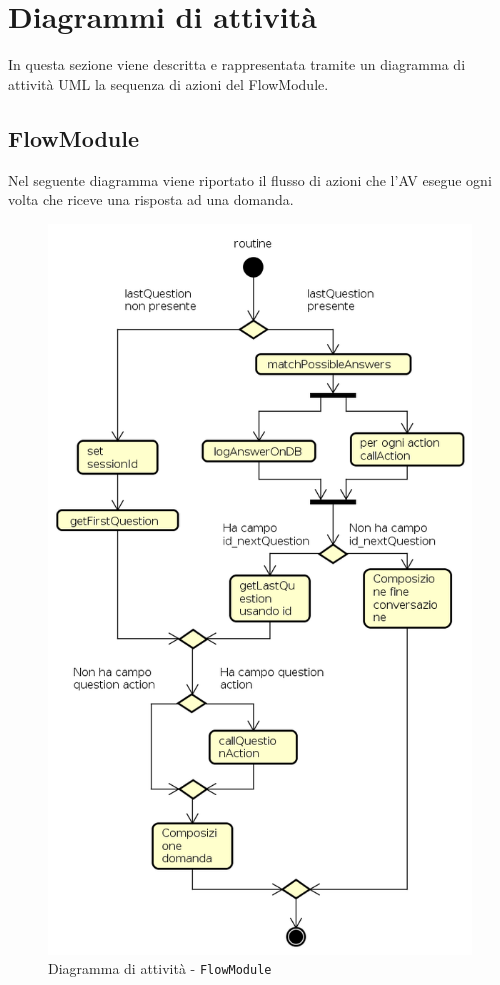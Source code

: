 \documentclass[../DefinizioneDiProdotto_v3.0.0.tex]{subfiles}
\begin{document}
\section{Diagrammi di attività}
In questa sezione viene descritta e rappresentata tramite un diagramma di attività UML la sequenza di azioni del FlowModule.

\subsection{FlowModule}
Nel seguente diagramma viene riportato il flusso di azioni che l'AV esegue ogni volta che riceve una risposta ad una domanda.

\begin{figure}[!h]
	\centering
	\includegraphics[scale=0.7]{DiagrammiFlusso/FlussoFlowModule.png}
	\caption{Diagramma di attività - \texttt{FlowModule}}
\end{figure}
\end{document}
